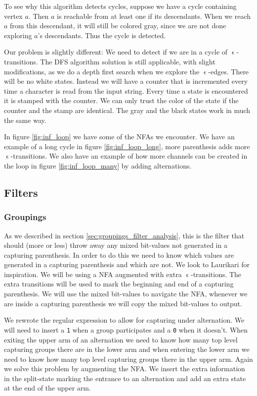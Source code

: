 To see why this algorithm detects cycles, suppose we have a cycle
containing vertex $a$. Then $a$ is reachable from at least one if its
descendants. When we reach $a$ from this descendant, it will still be
colored gray, since we are not done exploring $a$'s descendants. Thus
the cycle is detected.

Our problem is slightly different: We need to detect if we are in a
cycle of $\upvarepsilon$-transitions. The DFS algorithm solution is
still applicable, with slight modifications, as we do a depth first
search when we explore the $\upvarepsilon$-edges. There will be no
white states. Instead we will have a counter that is incremented every
time a character is read from the input string. Every time a state is
encountered it is stamped with the counter. We can only trust the
color of the state if the counter and the stamp are identical. The
gray and the black states work in much the same way.

In figure \vref{fig:inf_loop} we have some of the NFAs we
encounter. We have an example of a long cycle in figure
\ref{fig:inf_loop_long}, more parenthesis adds more
$\upvarepsilon$-transitions. We also have an example of how more
channels can be created in the loop in figure \ref{fig:inf_loop_many}
by adding alternations. 


\subsection{Filters}

\subsubsection{Groupings}

As we described in section \vref{sec:groupings_filter_analysis}, this
is the filter that should (more or less) throw away any mixed
bit-values not generated in a capturing parenthesis. In order to do
this we need to know which values are generated in a capturing
parenthesis and which are not. We look to Laurikari
\cite{laurikari2001} for inspiration. We will be using a NFA augmented
with extra $\upvarepsilon$-transitions. The extra transitions will be
used to mark the beginning and end of a capturing parenthesis. We will
use the mixed bit-values to navigate the NFA, whenever we are inside a
capturing parenthesis we will copy the mixed bit-values to output. 

We rewrote the regular expression to allow for capturing under
alternation. We will need to insert a \texttt{1} when a group
participates and a \texttt{0} when it doesn't. When exiting the upper
arm of an alternation we need to know how many top level capturing
groups there are in the lower arm and when entering the lower arm we
need to know how many top level capturing groups there in the upper
arm. Again we solve this problem by augmenting the NFA. We insert the
extra information in the split-state marking the entrance to an
alternation and add an extra state at the end of the upper arm.

